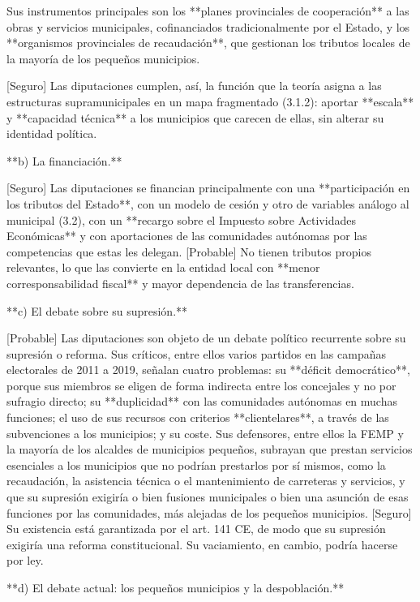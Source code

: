 \documentclass[10pt,a4paper]{article}
\begin{document}
Sus instrumentos principales son los **planes provinciales de cooperación** a las obras y servicios municipales, cofinanciados tradicionalmente por el Estado, y los **organismos provinciales de recaudación**, que gestionan los tributos locales de la mayoría de los pequeños municipios.

[Seguro] Las diputaciones cumplen, así, la función que la teoría asigna a las estructuras supramunicipales en un mapa fragmentado (3.1.2): aportar **escala** y **capacidad técnica** a los municipios que carecen de ellas, sin alterar su identidad política.

**b) La financiación.**

[Seguro] Las diputaciones se financian principalmente con una **participación en los tributos del Estado**, con un modelo de cesión y otro de variables análogo al municipal (3.2), con un **recargo sobre el Impuesto sobre Actividades Económicas** y con aportaciones de las comunidades autónomas por las competencias que estas les delegan. [Probable] No tienen tributos propios relevantes, lo que las convierte en la entidad local con **menor corresponsabilidad fiscal** y mayor dependencia de las transferencias.

**c) El debate sobre su supresión.**

[Probable] Las diputaciones son objeto de un debate político recurrente sobre su supresión o reforma. Sus críticos, entre ellos varios partidos en las campañas electorales de 2011 a 2019, señalan cuatro problemas: su **déficit democrático**, porque sus miembros se eligen de forma indirecta entre los concejales y no por sufragio directo; su **duplicidad** con las comunidades autónomas en muchas funciones; el uso de sus recursos con criterios **clientelares**, a través de las subvenciones a los municipios; y su coste. Sus defensores, entre ellos la FEMP y la mayoría de los alcaldes de municipios pequeños, subrayan que prestan servicios esenciales a los municipios que no podrían prestarlos por sí mismos, como la recaudación, la asistencia técnica o el mantenimiento de carreteras y servicios, y que su supresión exigiría o bien fusiones municipales o bien una asunción de esas funciones por las comunidades, más alejadas de los pequeños municipios. [Seguro] Su existencia está garantizada por el art. 141 CE, de modo que su supresión exigiría una reforma constitucional. Su vaciamiento, en cambio, podría hacerse por ley.

**d) El debate actual: los pequeños municipios y la despoblación.**
\end{document}
